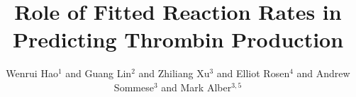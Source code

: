 \documentclass[10pt]{bmc_article}
\newenvironment{bmcformat}{\baselineskip20pt\sloppy\setboolean{publ}{false}}{\baselineskip20pt\sloppy}
\begin{document}
\begin{bmcformat}


\title{Role of Fitted Reaction Rates in Predicting
Thrombin Production}



\author{Wenrui Hao$^1$%
       and
         Guang Lin$^2$%
        and
         Zhiliang Xu$^3$%
         and
         Elliot Rosen$^4$%
        and
         Andrew Sommese\correspondingauthor$^3$%
        and
         Mark Alber\correspondingauthor$^{3,5}$%
      }



\address{%
    \iid(1) Mathematical Biosciences Institute, The Ohio State University, Columbus, OH, 43210 \\
    \iid(2) Computational Mathematics Group, Pacific Northwest National
Laboratory, 902 Battelle Boulevard, Richland, WA 99352\\
    \iid(3) Department of Applied and Computational Mathematics and
Statistics, University of Notre Dame, Notre Dame, IN 46556\\
    \iid(4) Department of Medical and Molecular Genetics,
Indiana University School of Medicine\\
    \iid(5) Department of Medicine, Indiana University School of Medicine
}%

\maketitle
\begin{abstract}

\end{abstract}




\end{bmcformat}
\end{document}

